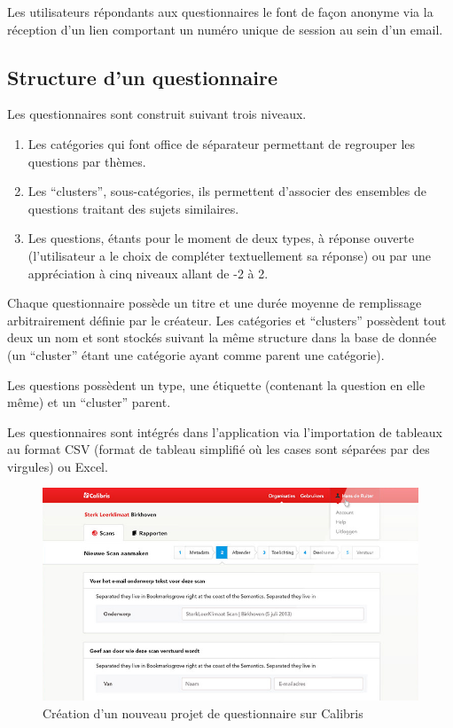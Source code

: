 \documentclass[12pt,a4paper]{book}
\begin{document}
Les utilisateurs répondants aux questionnaires le font de façon anonyme via la réception d'un lien comportant un numéro unique de session au sein d'un email.

\subsection{Structure d'un questionnaire}

Les questionnaires sont construit suivant trois niveaux. 

\begin{enumerate}
  \item Les catégories qui font office de séparateur permettant de regrouper les questions par thèmes.
  \item Les ``clusters'', sous-catégories, ils permettent d'associer des ensembles de questions traitant des sujets similaires.
  \item Les questions, étants pour le moment de deux types, à réponse ouverte (l'utilisateur a le choix de compléter textuellement sa réponse) ou par une appréciation à cinq niveaux allant de -2 à 2.
\end{enumerate}

Chaque questionnaire possède un titre et une durée moyenne de remplissage arbitrairement définie par le créateur. Les catégories et ``clusters'' possèdent tout deux un nom et sont stockés suivant la même structure dans la base de donnée (un ``cluster'' étant une catégorie ayant comme parent une catégorie).

Les questions possèdent un type, une étiquette (contenant la question en elle même) et un ``cluster'' parent.

Les questionnaires sont intégrés dans l'application via l'importation de tableaux au format CSV (format de tableau simplifié où les cases sont séparées par des virgules) ou Excel.

\begin{figure}[htp]
\centering
\includegraphics[scale=0.6]{img/calibris1.png}
 \caption{Création d'un nouveau projet de questionnaire sur Calibris}
 \label{fig.calibris1}
\end{figure}
\end{document}
